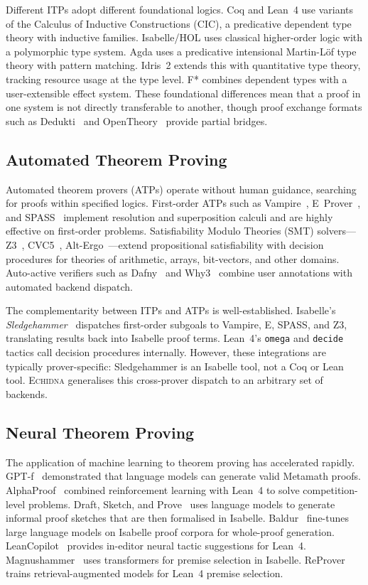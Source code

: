 \documentclass[11pt,a4paper]{article}
\newcommand{\echidna}{\textsc{Echidna}}
\begin{document}
Different ITPs adopt different foundational logics. Coq and Lean~4 use
variants of the Calculus of Inductive Constructions (CIC), a predicative
dependent type theory with inductive families. Isabelle/HOL uses classical
higher-order logic with a polymorphic type system. Agda uses a predicative
intensional Martin-L\"{o}f type theory with pattern matching. Idris~2 extends
this with quantitative type theory, tracking resource usage at the type level.
F* combines dependent types with a user-extensible effect system. These
foundational differences mean that a proof in one system is not directly
transferable to another, though proof exchange formats such as
Dedukti~\citep{dedukti} and OpenTheory~\citep{opentheory} provide partial
bridges.

\subsection{Automated Theorem Proving}

Automated theorem provers (ATPs) operate without human guidance, searching for
proofs within specified logics. First-order ATPs such as Vampire~\citep{vampire},
E~Prover~\citep{eprover}, and SPASS~\citep{spass} implement resolution and
superposition calculi and are highly effective on first-order problems.
Satisfiability Modulo Theories (SMT) solvers---Z3~\citep{z3}, CVC5~\citep{cvc5},
Alt-Ergo~\citep{altergo}---extend propositional satisfiability with
decision procedures for theories of arithmetic, arrays, bit-vectors, and
other domains. Auto-active verifiers such as Dafny~\citep{dafny} and
Why3~\citep{why3} combine user annotations with automated backend dispatch.

The complementarity between ITPs and ATPs is well-established.
Isabelle's \emph{Sledgehammer}~\citep{sledgehammer} dispatches first-order
subgoals to Vampire, E, SPASS, and Z3, translating results back into
Isabelle proof terms. Lean~4's \texttt{omega} and \texttt{decide} tactics
call decision procedures internally. However, these integrations are
typically prover-specific: Sledgehammer is an Isabelle tool, not a
Coq or Lean tool. \echidna{} generalises this cross-prover dispatch to an
arbitrary set of backends.

\subsection{Neural Theorem Proving}

The application of machine learning to theorem proving has accelerated
rapidly. GPT-f~\citep{gptf} demonstrated that language models can generate
valid Metamath proofs. AlphaProof~\citep{alphaproof} combined reinforcement
learning with Lean~4 to solve competition-level problems.
Draft, Sketch, and Prove~\citep{dsp} uses language models to generate
informal proof sketches that are then formalised in Isabelle.
Baldur~\citep{baldur} fine-tunes large language models on Isabelle proof
corpora for whole-proof generation. LeanCopilot~\citep{leancopilot} provides
in-editor neural tactic suggestions for Lean~4.
Magnushammer~\citep{magnushammer} uses transformers for premise selection in
Isabelle. ReProver~\citep{reprover} trains retrieval-augmented models for
Lean~4 premise selection.
\end{document}
